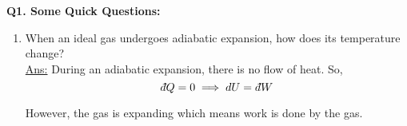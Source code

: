\documentclass[twoside]{article}
\def\beginrefs{\begin{list}%
        {[\arabic{equation}]}{\usecounter{equation}
         \setlength{\leftmargin}{2.0truecm}\setlength{\labelsep}{0.4truecm}%
         \setlength{\labelwidth}{1.6truecm}}}
\def\endrefs{\end{list}}
\def\bibentry#1{\item[\hbox{[#1]}]}
\newcommand{\dbar}{{\mkern3mu\mathchar'26\mkern-12mu d}}
\begin{document}
\textbf{Q1. Some Quick Questions:}
\begin{enumerate}
	\item When an ideal gas undergoes adiabatic expansion, how does its temperature change?
	\\
	\underline{Ans:} During an adiabatic expansion, there is no flow of heat. So,
	\[ \dbar Q = 0 \implies dU = \dbar W \]
	
	However, the gas is expanding which means work is done by the gas. 
	
\end{enumerate}

\end{document}
